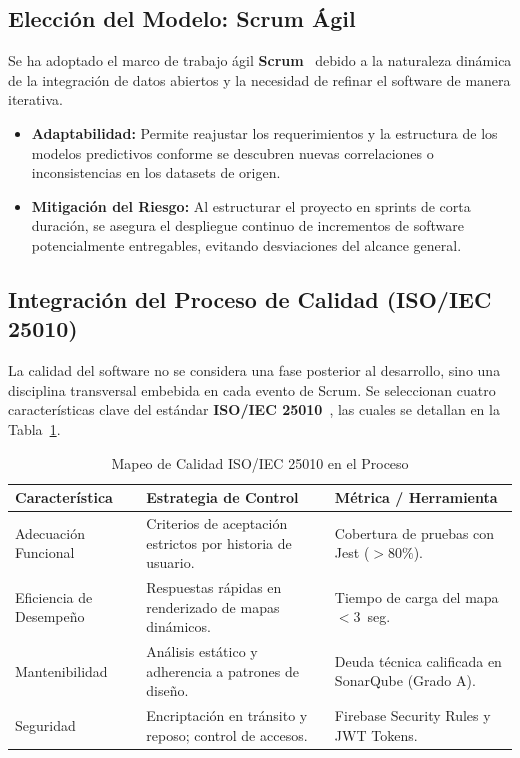 \documentclass[conference]{IEEEtran}
\begin{document}
\subsection{Elección del Modelo: Scrum Ágil}
Se ha adoptado el marco de trabajo ágil \textbf{Scrum}~\cite{scrum} debido a la naturaleza dinámica de la integración de datos abiertos y la necesidad de refinar el software de manera iterativa. 
\begin{itemize}
    \item \textbf{Adaptabilidad:} Permite reajustar los requerimientos y la estructura de los modelos predictivos conforme se descubren nuevas correlaciones o inconsistencias en los datasets de origen.
    \item \textbf{Mitigación del Riesgo:} Al estructurar el proyecto en sprints de corta duración, se asegura el despliegue continuo de incrementos de software potencialmente entregables, evitando desviaciones del alcance general.
\end{itemize}

\subsection{Integración del Proceso de Calidad (ISO/IEC 25010)}
La calidad del software no se considera una fase posterior al desarrollo, sino una disciplina transversal embebida en cada evento de Scrum. Se seleccionan cuatro características clave del estándar \textbf{ISO/IEC 25010}~\cite{iso25010}, las cuales se detallan en la Tabla~\ref{tab:calidad}.

\begin{table}[htbp]
\caption{Mapeo de Calidad ISO/IEC 25010 en el Proceso}
\label{tab:calidad}
\begin{center}
\begin{tabular}{>{\raggedright\arraybackslash}p{2.1cm}>{\raggedright\arraybackslash}p{3.1cm}>{\raggedright\arraybackslash}p{2.4cm}}
\toprule
\textbf{Característica} & \textbf{Estrategia de Control} & \textbf{Métrica / Herramienta} \\ \midrule
Adecuación Funcional & Criterios de aceptación estrictos por historia de usuario. & Cobertura de pruebas con Jest ($>80\%$). \\ \addlinespace
Eficiencia de Desempeño & Respuestas rápidas en renderizado de mapas dinámicos. & Tiempo de carga del mapa $< 3$~seg. \\ \addlinespace
Mantenibilidad & Análisis estático y adherencia a patrones de diseño. & Deuda técnica calificada en SonarQube (Grado A). \\ \addlinespace
Seguridad & Encriptación en tránsito y reposo; control de accesos. & Firebase Security Rules y JWT Tokens. \\
\bottomrule
\end{tabular}
\end{center}
\end{table}
\end{document}
